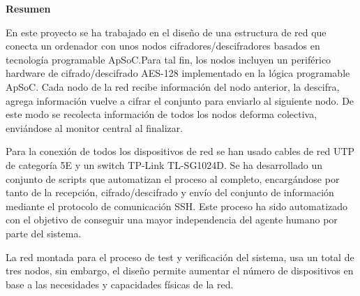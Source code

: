 \begin{center}
	\bigskip
	\bigskip
	\textbf{\huge {Resumen}}\\
	\bigskip
\end{center}

	En este proyecto se ha trabajado en el diseño de una estructura de red que conecta un ordenador con unos nodos cifradores/descifradores basados en tecnología programable ApSoC.Para tal fin, los nodos incluyen un periférico hardware de cifrado/descifrado AES-128 implementado en la lógica programable ApSoC. Cada nodo de la red recibe información del nodo anterior, la descifra, agrega información  vuelve a cifrar el conjunto para enviarlo al siguiente nodo. De este modo se recolecta información de todos los nodos deforma colectiva, enviándose al monitor central al finalizar.
	
	Para la conexión de todos los dispositivos de red se han usado cables de red UTP de categoría 5E y un switch TP-Link TL-SG1024D. Se ha desarrollado un conjunto de scripts que automatizan el proceso al completo, encargándose por tanto de la recepción, cifrado/descifrado y envío del conjunto de información mediante el protocolo de comunicación SSH. Este proceso ha sido automatizado con el objetivo de conseguir una mayor independencia del agente humano por parte del sistema.
	
	La red montada para el proceso de test y verificación del sistema, usa un total de tres nodos, sin embargo, el diseño permite aumentar el número de dispositivos en base a las necesidades y capacidades físicas de la red.